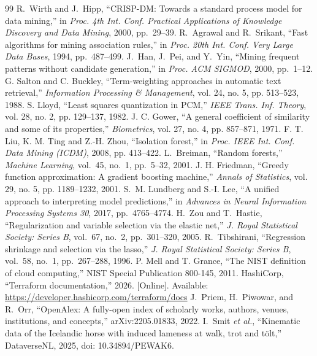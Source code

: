 \documentclass[conference,a4paper]{IEEEtran}
\begin{document}
\begin{thebibliography}{99}
 R.~Wirth and J.~Hipp, ``CRISP-DM: Towards a standard process model for data mining,'' in \emph{Proc. 4th Int. Conf. Practical Applications of Knowledge Discovery and Data Mining}, 2000, pp.~29--39.
 R.~Agrawal and R.~Srikant, ``Fast algorithms for mining association rules,'' in \emph{Proc. 20th Int. Conf. Very Large Data Bases}, 1994, pp.~487--499.
 J.~Han, J.~Pei, and Y.~Yin, ``Mining frequent patterns without candidate generation,'' in \emph{Proc. ACM SIGMOD}, 2000, pp.~1--12.
 G. Salton and C. Buckley, ``Term-weighting approaches in automatic text retrieval,'' \emph{Information Processing \& Management}, vol. 24, no. 5, pp. 513--523, 1988.
 S. Lloyd, ``Least squares quantization in PCM,'' \emph{IEEE Trans. Inf. Theory}, vol. 28, no. 2, pp. 129--137, 1982.
 J. C. Gower, ``A general coefficient of similarity and some of its properties,'' \emph{Biometrics}, vol. 27, no. 4, pp. 857--871, 1971.
 F. T. Liu, K. M. Ting and Z.-H. Zhou, ``Isolation forest,'' in \emph{Proc. IEEE Int. Conf. Data Mining (ICDM)}, 2008, pp. 413--422.
 L.~Breiman, ``Random forests,'' \emph{Machine Learning}, vol.~45, no.~1, pp.~5--32, 2001.
 J. H. Friedman, ``Greedy function approximation: A gradient boosting machine,'' \emph{Annals of Statistics}, vol. 29, no. 5, pp. 1189--1232, 2001.
 S.~M. Lundberg and S.-I. Lee, ``A unified approach to interpreting model predictions,'' in \emph{Advances in Neural Information Processing Systems 30}, 2017, pp.~4765--4774.
 H.~Zou and T.~Hastie, ``Regularization and variable selection via the elastic net,'' \emph{J. Royal Statistical Society: Series B}, vol.~67, no.~2, pp.~301--320, 2005.
 R.~Tibshirani, ``Regression shrinkage and selection via the lasso,'' \emph{J. Royal Statistical Society: Series B}, vol.~58, no.~1, pp.~267--288, 1996.
 P. Mell and T. Grance, ``The NIST definition of cloud computing,'' NIST Special Publication 800-145, 2011.
 HashiCorp, ``Terraform documentation,'' 2026. [Online]. Available: \url{https://developer.hashicorp.com/terraform/docs}
 J.~Priem, H.~Piwowar, and R.~Orr, ``OpenAlex: A fully-open index of scholarly works, authors, venues, institutions, and concepts,'' arXiv:2205.01833, 2022.
 I.~Smit \emph{et al.}, ``Kinematic data of the Icelandic horse with induced lameness at walk, trot and tölt,'' DataverseNL, 2025, doi: 10.34894/PEWAK6.
\end{thebibliography}
\end{document}
